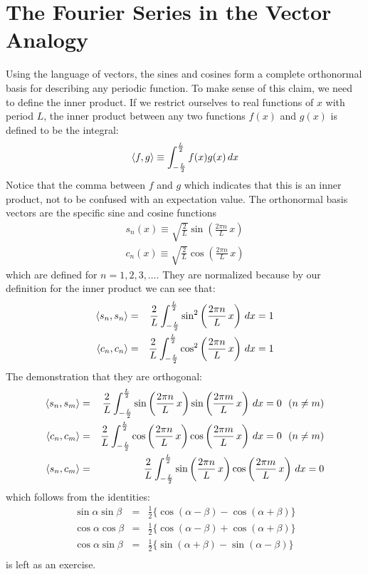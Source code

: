 \documentclass[12pt,oneside]{book}
\begin{document}
 
\section{The Fourier Series in the Vector Analogy}

Using the language of vectors, the sines and cosines form a complete orthonormal basis for describing any periodic function.  To make sense of this claim, we need to define the inner product. If we restrict ourselves to real functions of $x$ with period $L$, the inner product between any two functions $f(x)$ and $g(x)$ is defined to be the integral:
\begin{equation*}
\braket{f, g} \equiv \int_{-\frac{L}{2}}^{\frac{L}{2}} f(x) g(x) \, dx
\end{equation*}
Notice that the comma between $f$ and $g$ which indicates that this is an inner product, not to be confused with an expectation value.  The orthonormal basis vectors are the specific sine and cosine functions
\begin{eqnarray*}
s_n(x) \equiv \sqrt{\frac{2}{L}}\sin\left(\frac{2\pi n}{L} \, x \right)\\
c_n(x) \equiv \sqrt{\frac{2}{L}}\cos\left(\frac{2\pi n}{L} \, x \right)
\end{eqnarray*}
which are defined for $n=1,2,3,\ldots$.  They are normalized because by our definition for the inner product we can see that:
\begin{eqnarray*}
\braket{s_n, s_n} &=& \frac{2}{L} \int_{-\frac{L}{2}}^{\frac{L}{2}} \sin^2\left(\frac{2\pi n}{L} \, x \right) \, dx = 1 \\
\braket{c_n, c_n} &=& \frac{2}{L} \int_{-\frac{L}{2}}^{\frac{L}{2}} \cos^2\left(\frac{2\pi n}{L} \, x \right) \, dx = 1
\end{eqnarray*}
The demonstration that they are orthogonal:
\begin{eqnarray}
\braket{s_n, s_m} &=& \frac{2}{L} \int_{-\frac{L}{2}}^{\frac{L}{2}} 
\sin\left(\frac{2\pi n}{L} \, x \right) \sin\left(\frac{2\pi m}{L} \, x \right) \, dx = 0 ~~(n \neq m) \label{eqn:trigortha} \\
\braket{c_n, c_m} &=& \frac{2}{L} \int_{-\frac{L}{2}}^{\frac{L}{2}} 
\cos\left(\frac{2\pi n}{L} \, x \right) \cos\left(\frac{2\pi m}{L} \, x \right) \, dx = 0~~(n \neq m) \label{eqn:trigorthb}\\
\braket{s_n, c_m} &=& \frac{2}{L} \int_{-\frac{L}{2}}^{\frac{L}{2}} 
\sin\left(\frac{2\pi n}{L} \, x \right) \cos\left(\frac{2\pi m}{L} \, x \right) \, dx = 0 \label{eqn:trigorthc}
\end{eqnarray}
which follows from the identities:
\begin{eqnarray*}
\sin \alpha \sin \beta &=& \frac{1}{2} \{\cos(\alpha - \beta) - \cos(\alpha + \beta)\}\\
\cos \alpha \cos \beta &=& \frac{1}{2} \{\cos(\alpha - \beta) + \cos(\alpha + \beta)\}\\
\cos \alpha \sin \beta &=& \frac{1}{2} \{\sin(\alpha + \beta) - \sin(\alpha - \beta)\}\\
\end{eqnarray*}
is left as an exercise.
\end{document}
